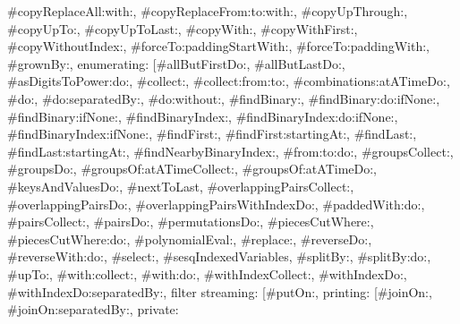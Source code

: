 {\textquotedbl{}\#copyReplaceAll:with:\textquotedbl{}, \textquotedbl{}\#copyReplaceFrom:to:with:\textquotedbl{}, \textquotedbl{}\#copyUpThrough:\textquotedbl{}, \textquotedbl{}\#copyUpTo:\textquotedbl{}, \textquotedbl{}\#copyUpToLast:\textquotedbl{}, \textquotedbl{}\#copyWith:\textquotedbl{}, \textquotedbl{}\#copyWithFirst:\textquotedbl{}, \textquotedbl{}\#copyWithoutIndex:\textquotedbl{}, \textquotedbl{}\#forceTo:paddingStartWith:\textquotedbl{}, \textquotedbl{}\#forceTo:paddingWith:\textquotedbl{}, \textquotedbl{}\#grownBy:\textquotedbl{}{]}, \textquotedbl{}enumerating\textquotedbl{}: {[}\textquotedbl{}\#allButFirstDo:\textquotedbl{}, \textquotedbl{}\#allButLastDo:\textquotedbl{}, \textquotedbl{}\#asDigitsToPower:do:\textquotedbl{}, \textquotedbl{}\#collect:\textquotedbl{}, \textquotedbl{}\#collect:from:to:\textquotedbl{}, \textquotedbl{}\#combinations:atATimeDo:\textquotedbl{}, \textquotedbl{}\#do:\textquotedbl{}, \textquotedbl{}\#do:separatedBy:\textquotedbl{}, \textquotedbl{}\#do:without:\textquotedbl{}, \textquotedbl{}\#findBinary:\textquotedbl{}, \textquotedbl{}\#findBinary:do:ifNone:\textquotedbl{}, \textquotedbl{}\#findBinary:ifNone:\textquotedbl{}, \textquotedbl{}\#findBinaryIndex:\textquotedbl{}, \textquotedbl{}\#findBinaryIndex:do:ifNone:\textquotedbl{}, \textquotedbl{}\#findBinaryIndex:ifNone:\textquotedbl{}, \textquotedbl{}\#findFirst:\textquotedbl{}, \textquotedbl{}\#findFirst:startingAt:\textquotedbl{}, \textquotedbl{}\#findLast:\textquotedbl{}, \textquotedbl{}\#findLast:startingAt:\textquotedbl{}, \textquotedbl{}\#findNearbyBinaryIndex:\textquotedbl{}, \textquotedbl{}\#from:to:do:\textquotedbl{}, \textquotedbl{}\#groupsCollect:\textquotedbl{}, \textquotedbl{}\#groupsDo:\textquotedbl{}, \textquotedbl{}\#groupsOf:atATimeCollect:\textquotedbl{}, \textquotedbl{}\#groupsOf:atATimeDo:\textquotedbl{}, \textquotedbl{}\#keysAndValuesDo:\textquotedbl{}, \textquotedbl{}\#nextToLast\textquotedbl{}, \textquotedbl{}\#overlappingPairsCollect:\textquotedbl{}, \textquotedbl{}\#overlappingPairsDo:\textquotedbl{}, \textquotedbl{}\#overlappingPairsWithIndexDo:\textquotedbl{}, \textquotedbl{}\#paddedWith:do:\textquotedbl{}, \textquotedbl{}\#pairsCollect:\textquotedbl{}, \textquotedbl{}\#pairsDo:\textquotedbl{}, \textquotedbl{}\#permutationsDo:\textquotedbl{}, \textquotedbl{}\#piecesCutWhere:\textquotedbl{}, \textquotedbl{}\#piecesCutWhere:do:\textquotedbl{}, \textquotedbl{}\#polynomialEval:\textquotedbl{}, \textquotedbl{}\#replace:\textquotedbl{}, \textquotedbl{}\#reverseDo:\textquotedbl{}, \textquotedbl{}\#reverseWith:do:\textquotedbl{}, \textquotedbl{}\#select:\textquotedbl{}, \textquotedbl{}\#sesqIndexedVariables\textquotedbl{}, \textquotedbl{}\#splitBy:\textquotedbl{}, \textquotedbl{}\#splitBy:do:\textquotedbl{}, \textquotedbl{}\#upTo:\textquotedbl{}, \textquotedbl{}\#with:collect:\textquotedbl{}, \textquotedbl{}\#with:do:\textquotedbl{}, \textquotedbl{}\#withIndexCollect:\textquotedbl{}, \textquotedbl{}\#withIndexDo:\textquotedbl{}, \textquotedbl{}\#withIndexDo:separatedBy:\textquotedbl{}{]}, \textquotedbl{}filter streaming\textquotedbl{}: {[}\textquotedbl{}\#putOn:\textquotedbl{}{]}, \textquotedbl{}printing\textquotedbl{}: {[}\textquotedbl{}\#joinOn:\textquotedbl{}, \textquotedbl{}\#joinOn:separatedBy:\textquotedbl{}{]}, \textquotedbl{}private\textquotedbl{}: }
